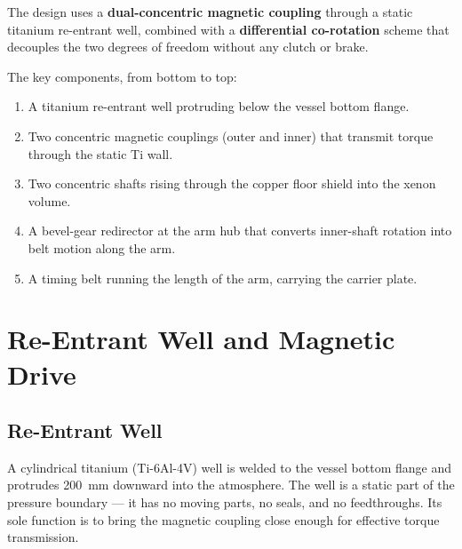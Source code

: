 \documentclass[11pt,a4paper]{article}
\begin{document}
The design uses a \textbf{dual-concentric magnetic coupling} through a
static titanium re-entrant well, combined with a
\textbf{differential co-rotation} scheme that decouples the two degrees
of freedom without any clutch or brake.

The key components, from bottom to top:
\begin{enumerate}[nosep]
  \item A titanium re-entrant well protruding below the vessel bottom
        flange.
  \item Two concentric magnetic couplings (outer and inner) that
        transmit torque through the static Ti wall.
  \item Two concentric shafts rising through the copper floor shield
        into the xenon volume.
  \item A bevel-gear redirector at the arm hub that converts inner-shaft
        rotation into belt motion along the arm.
  \item A timing belt running the length of the arm, carrying the
        carrier plate.
\end{enumerate}


\section{Re-Entrant Well and Magnetic Drive}
\label{sec:well}

\subsection{Re-Entrant Well}

A cylindrical titanium (Ti-6Al-4V) well is welded to the vessel bottom
flange and protrudes \SI{200}{mm} downward into the atmosphere. The well
is a static part of the pressure boundary --- it has no moving parts, no
seals, and no feedthroughs. Its sole function is to bring the magnetic
coupling close enough for effective torque transmission.
\end{document}
